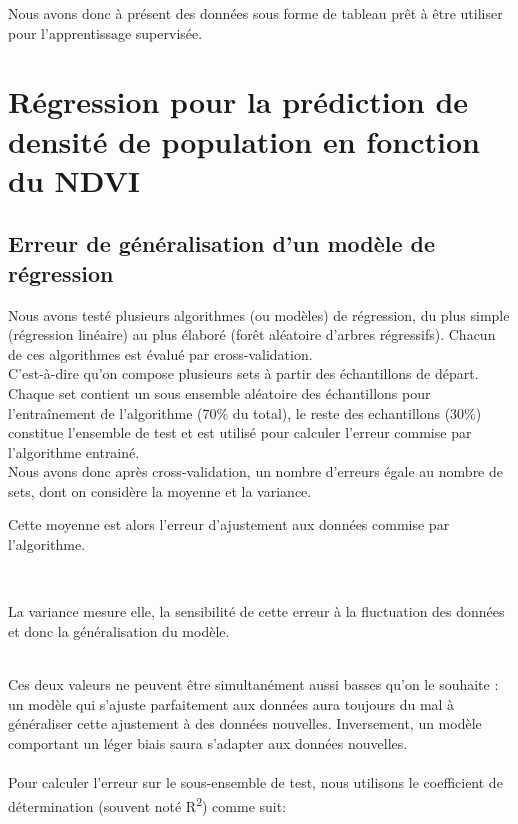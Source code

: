 \documentclass{book}
\begin{document}
\clearpage

Nous avons donc à présent des données sous forme de tableau prêt à être utiliser pour l'apprentissage supervisée.

\chapter{Régression pour la prédiction de densité de population en fonction du NDVI}

\section{Erreur de généralisation d'un modèle de régression}

Nous avons testé plusieurs algorithmes (ou modèles) de régression, du plus simple (régression linéaire) au plus élaboré (forêt aléatoire d'arbres régressifs).
Chacun de ces algorithmes est évalué par cross-validation. \\
C'est-à-dire qu'on compose plusieurs sets à partir des échantillons de départ. Chaque set contient un sous ensemble
aléatoire des échantillons pour l'entraînement de l'algorithme (70\% du total), le reste des echantillons (30\%) constitue l'ensemble de test
et est utilisé pour calculer l'erreur commise par l'algorithme entrainé.\\
Nous avons donc après cross-validation, un nombre d'erreurs égale au nombre de sets, dont on considère la moyenne et la variance.\\
\begin{bf}Cette moyenne est alors l'erreur d'ajustement aux données commise par l'algorithme.\end{bf}\\
\begin{bf}La variance mesure elle, la sensibilité de cette erreur à la fluctuation des données et donc la généralisation du modèle.\end{bf}\\
Ces deux valeurs ne peuvent être simultanément aussi basses qu'on le souhaite : un modèle qui s'ajuste parfaitement aux données aura toujours du
mal à généraliser cette ajustement à des données nouvelles. Inversement, un modèle comportant un léger biais saura s'adapter aux données nouvelles.\\
\\
Pour calculer l'erreur sur le sous-ensemble de test, nous utilisons le coefficient de détermination (souvent noté R\textsuperscript{2}) comme suit:
\end{document}
